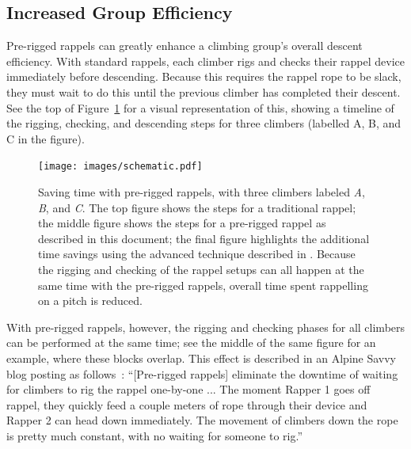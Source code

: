 \documentclass[nonacm,acmtog]{acmart}
\begin{document}
\subsection{Increased Group Efficiency}
\label{sec:efficiency}

  Pre-rigged rappels can greatly enhance a climbing group's overall descent
  efficiency.  With standard rappels, each climber rigs and checks their rappel
  device immediately before descending.  Because this requires the rappel rope
  to be slack, they must wait to do this until the previous climber has
  completed their descent.  See the top of Figure~\ref{fig:schematic} for a
  visual representation of this, showing a timeline of the rigging, checking,
  and descending steps for three climbers (labelled A, B, and C in the figure).

  \begin{figure}[h]
   \texttt{[image: images/schematic.pdf]}
   \caption{Saving time with pre-rigged rappels, with three climbers labeled
   {\it A}, {\it B}, and {\it C}.  The top figure shows the steps for a
   traditional rappel; the middle figure shows the steps for a pre-rigged
   rappel as described in this document; the final figure highlights the
   additional time savings using the advanced technique described in
   .  Because the rigging and checking of the rappel
   setups can all happen at the same time with the pre-rigged rappels, overall
   time spent rappelling on a pitch is reduced.} \label{fig:schematic}
  \end{figure}

  With pre-rigged rappels, however, the rigging and checking phases for all
  climbers can be performed at the same time; see the middle of the same figure
  for an example, where these blocks overlap.  This effect is described in an
  Alpine Savvy blog posting as follows~\cite{alpinesavvy:pre-rigged-rappels}:
  ``[Pre-rigged rappels] eliminate the downtime of waiting for climbers to rig
  the rappel one-by-one ...  The moment Rapper 1 goes off rappel, they quickly
  feed a couple meters of rope through their device and Rapper 2 can head down
  immediately. The movement of climbers down the rope is pretty much constant,
  with no waiting for someone to rig.''

\end{document}
